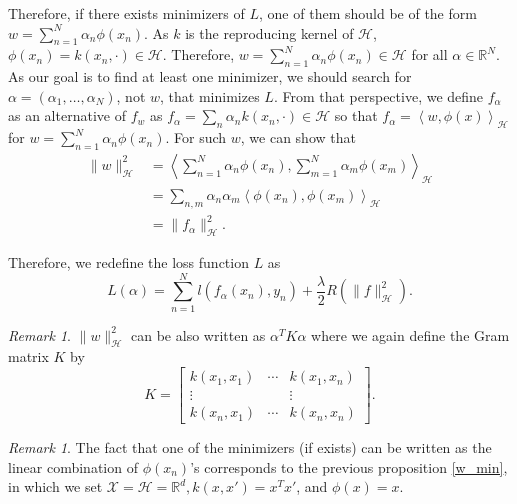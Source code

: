 \documentclass{amsart}
\theoremstyle{definition}
\theoremstyle{remark}
\newtheorem{remark}[theorem]{Remark}
\numberwithin{equation}{section}
\begin{document}
Therefore, if there exists minimizers of $L$, one of them should be of the form $w=\sum_{n=1}^{N}\alpha_n \phi(x_n)$.
As $k$ is the reproducing kernel of $\mathcal{H}$, $\phi(x_n) = k(x_n, \cdot)\in \mathcal{H}$.
Therefore, $w=\sum_{n=1}^N \alpha_n \phi(x_n)\in \mathcal{H}$ for all $\alpha \in \mathbb{R}^N$.
As our goal is to find at least one minimizer, we should search for $\alpha=(\alpha_1, \ldots, \alpha_N)$, not $w$, that minimizes $L$.
From that perspective, we define $f_\alpha$ as an alternative of $f_w$ as $f_\alpha = \sum_{n} \alpha_n k(x_n, \cdot)\in \mathcal{H}$
so that $f_\alpha = \left< w, \phi(x)\right>_\mathcal{H}$ for $w = \sum_{n=1}^N \alpha_n \phi(x_n)$.
For such $w$, we can show that
\begin{equation}
\begin{split}
\|w\|_\mathcal{H}^2 &= \left<\sum_{n=1}^N \alpha_n \phi(x_n), \sum_{m=1}^N \alpha_m \phi(x_m) \right>_\mathcal{H}\\
                    &= \sum_{n, m} \alpha_n \alpha_m \left< \phi(x_n), \phi(x_m)\right>_\mathcal{H}\\
                    &= \|f_\alpha\|_\mathcal{H}^2.
\end{split}
\end{equation}

Therefore, we redefine the loss function $L$ as
\begin{equation}
L(\alpha) = \sum_{n=1}^N l(f_\alpha(x_n), y_n) + \frac{\lambda}{2} R(\|f\|_\mathcal{H}^2).
\end{equation}

\begin{remark}
$\|w\|_\mathcal{H}^2$ can be also written as $\alpha^T K \alpha$ where we again define the Gram matrix $K$ by
\begin{equation}
K=
\begin{bmatrix}
k(x_1, x_1) & \cdots & k(x_1, x_n)\\
\vdots & & \vdots\\
k(x_n, x_1) & \cdots & k(x_n, x_n)
\end{bmatrix}
.
\end{equation}
\end{remark}

\begin{remark}
The fact that one of the minimizers (if exists) can be written as the linear combination of
$\phi(x_n)$'s corresponds to the previous proposition \ref{w_min}, in which we set $\mathcal{X}=\mathcal{H}=\mathbb{R}^d, k(x, x') = x^Tx'$, and $\phi(x)=x$.
\end{remark}
\end{document}
